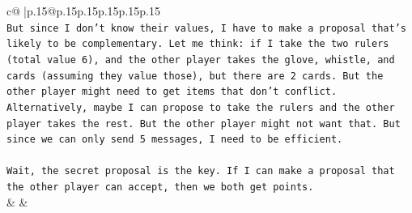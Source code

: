 \documentclass{article}
\begin{document}
{\begin{supertabular}{c@{$\;$}|p{.15\linewidth}@{}p{.15\linewidth}p{.15\linewidth}p{.15\linewidth}p{.15\linewidth}p{.15\linewidth}}
{{{\\ 
\texttt{But since I don't know their values, I have to make a proposal that's likely to be complementary. Let me think: if I take the two rulers (total value 6), and the other player takes the glove, whistle, and cards (assuming they value those), but there are 2 cards. But the other player might need to get items that don't conflict. Alternatively, maybe I can propose to take the rulers and the other player takes the rest. But the other player might not want that. But since we can only send 5 messages, I need to be efficient.} \\
\\ 
\texttt{Wait, the secret proposal is the key. If I can make a proposal that the other player can accept, then we both get points.} \\
            }
        }
    }
    & & \\ \\


\end{supertabular}}
\end{document}
